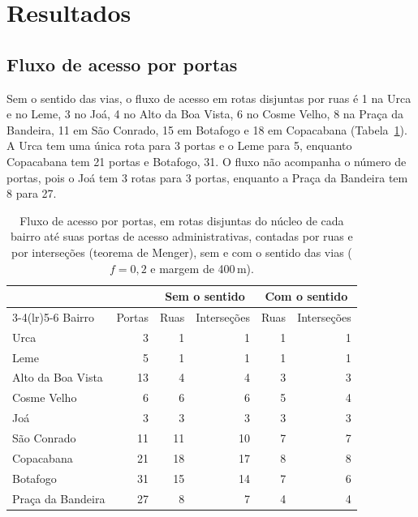 \section{Resultados}
\label{sec:results}

\subsection{Fluxo de acesso por portas}
\label{sec:res-access}

Sem o sentido das vias, o fluxo de acesso em rotas disjuntas por ruas é 1 na
Urca e no Leme, 3 no Joá, 4 no Alto da Boa Vista, 6 no Cosme Velho, 8 na Praça
da Bandeira, 11 em São Conrado, 15 em Botafogo e 18 em Copacabana
(Tabela~\ref{tab:acesso}). A Urca tem uma única rota para 3 portas e o Leme
para 5, enquanto Copacabana tem 21 portas e Botafogo, 31. O fluxo não acompanha
o número de portas, pois o Joá tem 3 rotas para 3 portas, enquanto a Praça da
Bandeira tem 8 para 27.

\begin{table}[tbp]
\centering
\caption{Fluxo de acesso por portas, em rotas disjuntas do núcleo de cada
bairro até suas portas de acesso administrativas, contadas por ruas e por
interseções (teorema de Menger), sem e com o sentido das vias ($f=0{,}2$ e
margem de 400\,m).}
\label{tab:acesso}
\small
\setlength{\tabcolsep}{4pt}
\begin{tabular}{lrrrrr}
\toprule
 & & \multicolumn{2}{c}{Sem o sentido} & \multicolumn{2}{c}{Com o sentido} \\
\cmidrule(lr){3-4}\cmidrule(lr){5-6}
Bairro & Portas & Ruas & Interseções & Ruas & Interseções \\
\midrule
Urca              &  3 &  1 &  1 & 1 & 1 \\
Leme              &  5 &  1 &  1 & 1 & 1 \\
Alto da Boa Vista & 13 &  4 &  4 & 3 & 3 \\
Cosme Velho       &  6 &  6 &  6 & 5 & 4 \\
Joá               &  3 &  3 &  3 & 3 & 3 \\
São Conrado       & 11 & 11 & 10 & 7 & 7 \\
Copacabana        & 21 & 18 & 17 & 8 & 8 \\
Botafogo          & 31 & 15 & 14 & 7 & 6 \\
Praça da Bandeira & 27 &  8 &  7 & 4 & 4 \\
\bottomrule
\end{tabular}
\end{table}

